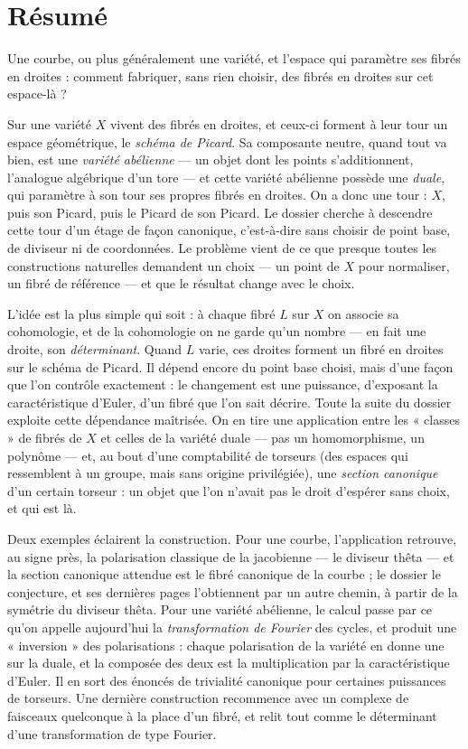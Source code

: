 \documentclass[11pt,a4paper]{article}
\begin{document}
\section*{Résumé}

\begin{resume}
Une courbe, ou plus généralement une variété, et l'espace qui paramètre ses
fibrés en droites : comment fabriquer, sans rien choisir, des fibrés en droites
sur cet espace-là ?

Sur une variété $X$ vivent des fibrés en droites, et ceux-ci forment à leur
tour un espace géométrique, le \emph{schéma de Picard}. Sa composante neutre,
quand tout va bien, est une \emph{variété abélienne} — un objet dont les points
s'additionnent, l'analogue algébrique d'un tore — et cette variété abélienne
possède une \emph{duale}, qui paramètre à son tour ses propres fibrés en
droites. On a donc une tour : $X$, puis son Picard, puis le Picard de son
Picard. Le dossier cherche à descendre cette tour d'un étage de façon
canonique, c'est-à-dire sans choisir de point base, de diviseur ni de
coordonnées. Le problème vient de ce que presque toutes les constructions
naturelles demandent un choix — un point de $X$ pour normaliser, un fibré de
référence — et que le résultat change avec le choix.

L'idée est la plus simple qui soit : à chaque fibré $L$ sur $X$ on associe sa
cohomologie, et de la cohomologie on ne garde qu'un nombre — en fait une
droite, son \emph{déterminant}. Quand $L$ varie, ces droites forment un fibré
en droites sur le schéma de Picard. Il dépend encore du point base choisi, mais
d'une façon que l'on contrôle exactement : le changement est une puissance,
d'exposant la caractéristique d'Euler, d'un fibré que l'on sait décrire. Toute
la suite du dossier exploite cette dépendance maîtrisée. On en tire une
application entre les « classes » de fibrés de $X$ et celles de la variété
duale — pas un homomorphisme, un polynôme — et, au bout d'une comptabilité de
torseurs (des espaces qui ressemblent à un groupe, mais sans origine
privilégiée), une \emph{section canonique} d'un certain torseur : un objet que
l'on n'avait pas le droit d'espérer sans choix, et qui est là.

Deux exemples éclairent la construction. Pour une courbe, l'application
retrouve, au signe près, la polarisation classique de la jacobienne — le
diviseur thêta — et la section canonique attendue est le fibré canonique de la
courbe ; le dossier le conjecture, et ses dernières pages l'obtiennent par un
autre chemin, à partir de la symétrie du diviseur thêta. Pour une variété
abélienne, le calcul passe par ce qu'on appelle aujourd'hui la
\emph{transformation de Fourier} des cycles, et produit une « inversion » des
polarisations : chaque polarisation de la variété en donne une sur la duale,
et la composée des deux est la multiplication par la caractéristique d'Euler.
Il en sort des énoncés de trivialité canonique pour certaines puissances de
torseurs. Une dernière construction recommence avec un complexe de faisceaux
quelconque à la place d'un fibré, et relit tout comme le déterminant d'une
transformation de type Fourier.


\end{resume}
\end{document}
